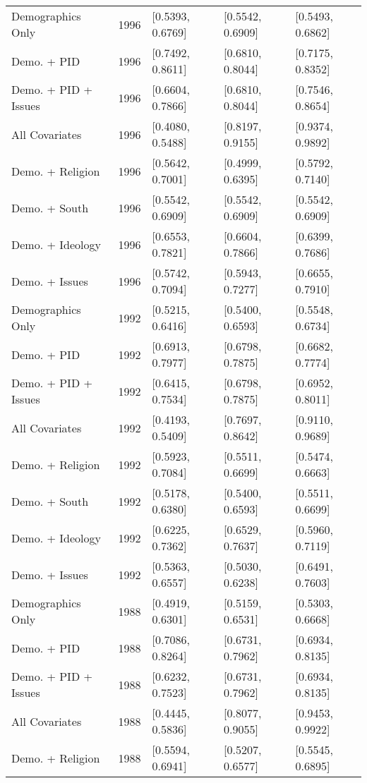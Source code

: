 \begin{longtable}{lrlll}
  Demographics Only & 1996 & [0.5393, 0.6769] & [0.5542, 0.6909] & [0.5493, 0.6862] \\ 
  Demo. + PID & 1996 & [0.7492, 0.8611] & [0.6810, 0.8044] & [0.7175, 0.8352] \\ 
  Demo. + PID + Issues & 1996 & [0.6604, 0.7866] & [0.6810, 0.8044] & [0.7546, 0.8654] \\ 
  All Covariates & 1996 & [0.4080, 0.5488] & [0.8197, 0.9155] & [0.9374, 0.9892] \\ 
  Demo. + Religion & 1996 & [0.5642, 0.7001] & [0.4999, 0.6395] & [0.5792, 0.7140] \\ 
  Demo. + South & 1996 & [0.5542, 0.6909] & [0.5542, 0.6909] & [0.5542, 0.6909] \\ 
  Demo. + Ideology & 1996 & [0.6553, 0.7821] & [0.6604, 0.7866] & [0.6399, 0.7686] \\ 
  Demo. + Issues & 1996 & [0.5742, 0.7094] & [0.5943, 0.7277] & [0.6655, 0.7910] \\ 
  Demographics Only & 1992 & [0.5215, 0.6416] & [0.5400, 0.6593] & [0.5548, 0.6734] \\ 
  Demo. + PID & 1992 & [0.6913, 0.7977] & [0.6798, 0.7875] & [0.6682, 0.7774] \\ 
  Demo. + PID + Issues & 1992 & [0.6415, 0.7534] & [0.6798, 0.7875] & [0.6952, 0.8011] \\ 
  All Covariates & 1992 & [0.4193, 0.5409] & [0.7697, 0.8642] & [0.9110, 0.9689] \\ 
  Demo. + Religion & 1992 & [0.5923, 0.7084] & [0.5511, 0.6699] & [0.5474, 0.6663] \\ 
  Demo. + South & 1992 & [0.5178, 0.6380] & [0.5400, 0.6593] & [0.5511, 0.6699] \\ 
  Demo. + Ideology & 1992 & [0.6225, 0.7362] & [0.6529, 0.7637] & [0.5960, 0.7119] \\ 
  Demo. + Issues & 1992 & [0.5363, 0.6557] & [0.5030, 0.6238] & [0.6491, 0.7603] \\ 
  Demographics Only & 1988 & [0.4919, 0.6301] & [0.5159, 0.6531] & [0.5303, 0.6668] \\ 
  Demo. + PID & 1988 & [0.7086, 0.8264] & [0.6731, 0.7962] & [0.6934, 0.8135] \\ 
  Demo. + PID + Issues & 1988 & [0.6232, 0.7523] & [0.6731, 0.7962] & [0.6934, 0.8135] \\ 
  All Covariates & 1988 & [0.4445, 0.5836] & [0.8077, 0.9055] & [0.9453, 0.9922] \\ 
  Demo. + Religion & 1988 & [0.5594, 0.6941] & [0.5207, 0.6577] & [0.5545, 0.6895] \\ 

\end{longtable}
